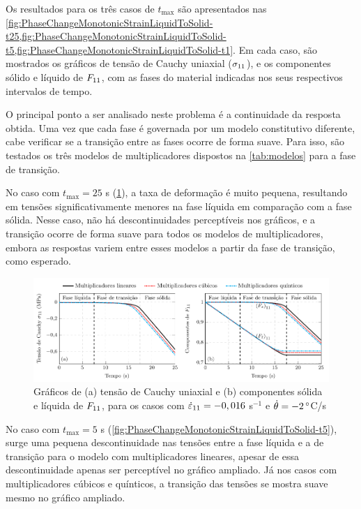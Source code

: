 \documentclass[Tese.tex]{subfiles}
\begin{document}
Os resultados para os três casos de $t_\text{max}$ são apresentados nas  \cref{fig:PhaseChangeMonotonicStrainLiquidToSolid-t25,fig:PhaseChangeMonotonicStrainLiquidToSolid-t5,fig:PhaseChangeMonotonicStrainLiquidToSolid-t1}. Em cada caso, são mostrados os gráficos de tensão de Cauchy uniaxial (${\sigma}_{11}$), e os componentes sólido e líquido de $F_{11}$, com as fases do material indicadas nos seus respectivos intervalos de tempo.

O principal ponto a ser analisado neste problema é a continuidade da resposta obtida. Uma vez que cada fase é governada por um modelo constitutivo diferente, cabe verificar se a transição entre as fases ocorre de forma suave. Para isso, são testados os três modelos de multiplicadores dispostos na \cref{tab:modelos} para a fase de transição.

No caso com $t_\text{max}=25$ s (\cref{fig:PhaseChangeMonotonicStrainLiquidToSolid-t25}), a taxa de deformação é muito pequena, resultando em tensões significativamente menores na fase líquida em comparação com a fase sólida. Nesse caso, não há descontinuidades perceptíveis nos gráficos, e a transição ocorre de forma suave para todos os modelos de multiplicadores, embora as respostas variem entre esses modelos a partir da fase de transição, como esperado.

\begin{figure}[htb]
	\centering
	\caption{Gráficos de (a) tensão de Cauchy uniaxial e (b) componentes sólida e líquida de $F_{11}$, para os casos com $\dot{{\varepsilon}}_{11} = -0,016$ s$^{-1}$ e $\dot{\theta} = -2\, ^{\circ}$C/s}
	\label{fig:PhaseChangeMonotonicStrainLiquidToSolid-t25}
	\includegraphics[scale=1.0]{Figuras/PhaseChangeMonotonic/PhaseChangeMonotonicStrainLiquidToSolid-t25.pdf}
\end{figure}

No caso com $t_\text{max}=5$ s (\cref{fig:PhaseChangeMonotonicStrainLiquidToSolid-t5}), surge uma pequena descontinuidade nas tensões entre a fase líquida e a de transição para o modelo com multiplicadores lineares, apesar de essa descontinuidade apenas ser perceptível no gráfico ampliado. Já nos casos com multiplicadores cúbicos e quínticos, a transição das tensões se mostra suave mesmo no gráfico ampliado.
\end{document}
